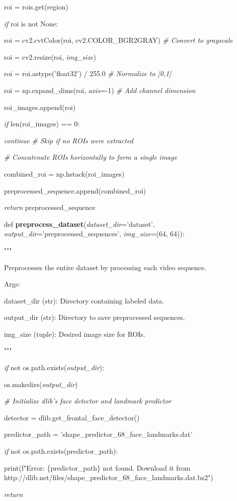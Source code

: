 \documentclass[
]{article}
\begin{document}
roi = rois.get(region)

\emph{if} roi is not None:

roi = cv2.cvtColor(roi, cv2.COLOR\_BGR2GRAY) \emph{\# Convert to grayscale}

roi = cv2.resize(roi, \emph{img\_size})

roi = roi.astype('float32') / 255.0 \emph{\# Normalize to {[}0,1{]}}

roi = np.expand\_dims(roi, \emph{axis}=-1) \emph{\# Add channel dimension}

roi\_images.append(roi)

\emph{if} len(roi\_images) == 0:

\emph{continue} \emph{\# Skip if no ROIs were extracted}

\emph{\# Concatenate ROIs horizontally to form a single image}

combined\_roi = np.hstack(roi\_images)

preprocessed\_sequence.append(combined\_roi)

\emph{return} preprocessed\_sequence

def \textbf{preprocess\_dataset}(\emph{dataset\_dir}='dataset', \emph{output\_dir}='preprocessed\_sequences', \emph{img\_size}=(64, 64)):

"""

Preprocesses the entire dataset by processing each video sequence.

Args:

dataset\_dir (str): Directory containing labeled data.

output\_dir (str): Directory to save preprocessed sequences.

img\_size (tuple): Desired image size for ROIs.

"""

\emph{if} not os.path.exists(\emph{output\_dir}):

os.makedirs(\emph{output\_dir})

\emph{\# Initialize dlib's face detector and landmark predictor}

detector = dlib.get\_frontal\_face\_detector()

predictor\_path = 'shape\_predictor\_68\_face\_landmarks.dat'

\emph{if} not os.path.exists(predictor\_path):

print(f"Error: \{predictor\_path\} not found. Download it from http://dlib.net/files/shape\_predictor\_68\_face\_landmarks.dat.bz2")

\emph{return}
\end{document}
